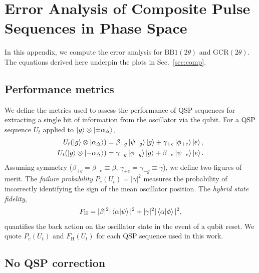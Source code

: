 \documentclass[aps,prx,showpacs,notitlepage,twocolumn,superscriptaddress,nofootinbib,preprintnumbers,floatfix,10pt, longbibliography]{revtex4-2}
\begin{document}
\section{Error Analysis of Composite Pulse Sequences in Phase Space}
\label{app:comp_err}

In this appendix, we compute the error analysis for $\mathrm{BB1}(2\theta)$ and $\mathrm{GCR}(2\theta)$. The equations derived here underpin the plots in Sec.~\ref{sec:comp}.

\subsection{Performance metrics}
\label{app:perf_metrics}

We define the metrics used to assess the performance of QSP sequences for extracting a single bit of information from the oscillator via the qubit. For a QSP sequence $U_t$ applied to $\ket{g}\otimes\ket{\pm\alpha_\Delta}$,
\begin{align}
U_t(\ket{g}\otimes\ket{\alpha_\Delta})
  &= \beta_{+g}\ket{\psi_{+g}}\ket{g}+\gamma_{+e}\ket{\phi_{+e}}\ket{e}, \\
U_t(\ket{g}\otimes\ket{-\alpha_\Delta})
  &= \gamma_{-g}\ket{\phi_{-g}}\ket{g}+\beta_{-e}\ket{\psi_{-e}}\ket{e}.
\end{align}
Assuming symmetry ($\beta_{+g}=\beta_{-e}\equiv\beta$, $\gamma_{+e}=\gamma_{-g}\equiv\gamma$), we define two figures of merit. The \textit{failure probability} $P_e(U_t)=|\gamma|^2$ measures the probability of incorrectly identifying the sign of the mean oscillator position. The \textit{hybrid state fidelity},
\begin{align}
F_\mathrm{H} = |\beta|^2|\braket{\alpha|\psi}|^2+|\gamma|^2|\braket{\alpha|\phi}|^2,
\end{align}
quantifies the back action on the oscillator state in the event of a qubit reset. We quote $P_e(U_t)$ and $F_\mathrm{H}(U_t)$ for each QSP sequence used in this work.

\subsection{No QSP correction}
\label{app:no_corr}
\end{document}
